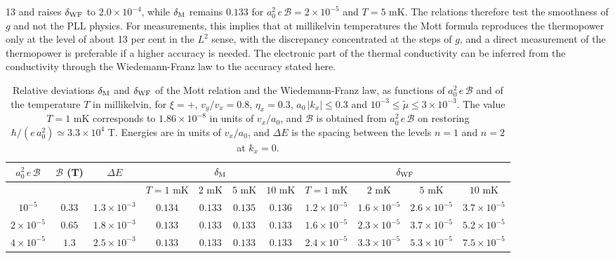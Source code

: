 \documentclass[aps,prb, onecolumn, nofootinbib, citeautoscript,10pt]{revtex4-2}
\newcommand{\red}[1]{{\color{red}#1}}
\begin{document}
\red{13} and raises $\delta_{\rm WF}$ to \red{$2.0\times10^{-4}$}, while $\delta_{\rm M}$ remains \red{$0.133$} for $a_0^2\,e\,\mathcal B=2\times10^{-5}$ and $T=5$ mK. The relations therefore test the smoothness of $g$ and not the PLL physics. For measurements, this implies that at millikelvin temperatures the Mott formula reproduces the thermopower only at the level of \red{about 13 per cent} in the $L^2$ sense, with the discrepancy concentrated at the steps of $g$, and a direct measurement of the thermopower is preferable if a higher accuracy is needed. The electronic part of the thermal conductivity can be inferred from the conductivity through the Wiedemann-Franz law to the accuracy stated here.


\begin{table}[t!]
\centering
\small
\renewcommand{\arraystretch}{1.4}

\begin{tabular}{|c|c|c|c|c|c|c|c|c|c|c|}
\hline
$a_0^2\,e\,\mathcal B$ & $\mathcal B$ (T) & $\Delta E$ & \multicolumn{4}{c|}{$\delta_{\rm M}$} & \multicolumn{4}{c|}{$\delta_{\rm WF}$} \\
\hline
 &  &  & $T=1$ mK & $2$ mK & $5$ mK & $10$ mK & $T=1$ mK & $2$ mK & $5$ mK & $10$ mK \\
\hline
$10^{-5}$ & $0.33$ & \red{$1.3\times10^{-3}$} & \red{$0.134$} & \red{$0.133$} & \red{$0.135$} & \red{$0.136$} & \red{$1.2\times10^{-5}$} & \red{$1.6\times10^{-5}$} & \red{$2.6\times10^{-5}$} & \red{$3.7\times10^{-5}$} \\
\hline
$2\times10^{-5}$ & $0.65$ & $1.8\times10^{-3}$ & \red{$0.133$} & \red{$0.133$} & \red{$0.133$} & \red{$0.133$} & \red{$1.6\times10^{-5}$} & \red{$2.3\times10^{-5}$} & \red{$3.7\times10^{-5}$} & \red{$5.2\times10^{-5}$} \\
\hline
$4\times10^{-5}$ & $1.3$ & $2.5\times10^{-3}$ & \red{$0.133$} & \red{$0.133$} & \red{$0.133$} & \red{$0.133$} & \red{$2.4\times10^{-5}$} & \red{$3.3\times10^{-5}$} & \red{$5.3\times10^{-5}$} & \red{$7.5\times10^{-5}$} \\
\hline
\end{tabular}
\caption{Relative deviations $\delta_{\rm M}$ and $\delta_{\rm WF}$ of the Mott relation and the Wiedemann-Franz law, as functions of $a_0^2\,e\,\mathcal B$ and of the temperature $T$ in millikelvin, for $\xi=+$, $v_y/v_x=0.8$, $\eta_x=0.3$, $a_0\,|k_x|\le0.3$ and $10^{-3}\le\tilde\mu\le3\times10^{-3}$. The value $T=1$ mK corresponds to $1.86\times10^{-8}$ in units of $v_x/a_0$, and $\mathcal B$ is obtained from $a_0^2\,e\,\mathcal B$ on restoring $\hbar/(e\,a_0^2)\simeq3.3\times10^{4}$ T. Energies are in units of $v_x/a_0$, and $\Delta E$ is the spacing between the levels $n=1$ and $n=2$ at $k_x=0$.\label{tabdev}}
\end{table}
\end{document}

